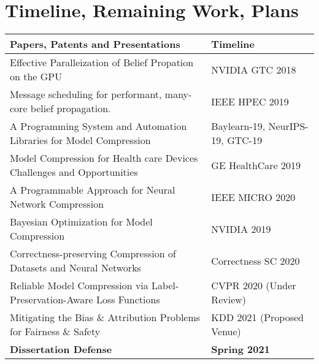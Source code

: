 \section{Timeline, Remaining Work, Plans}
\label{sec:timeline}

\begin{table*}[h]
\centering
\begin{center}
\begin{sc}
\begin{tabular}{ll}
\toprule
\textbf{Papers, Patents and Presentations}                                                  & \textbf{Timeline}        \\ \midrule
Effective Paralleization of Belief Propation on the GPU                  & NVIDIA GTC 2018          \\ 
Message scheduling for performant, many-core belief propagation.         & IEEE HPEC 2019           \\ \midrule
A Programming System and Automation Libraries for Model Compression                           & Baylearn-19, NeurIPS-19, GTC-19 \\
Model Compression for Health care Devices Challenges and Opportunities    & GE HealthCare 2019       \\
A Programmable Approach for Neural Network  Compression                  & IEEE MICRO 2020          \\
Bayesian Optimization for Model Compression                              & NVIDIA 2019              \\ \midrule
Correctness-preserving Compression of Datasets and Neural Networks & Correctness SC 2020      \\
Reliable Model Compression via Label-Preservation-Aware Loss Functions   & CVPR 2020 (Under Review) \\
Mitigating the Bias \& Attribution Problems for Fairness \& Safety & KDD 2021 (Proposed Venue)                             \\ \midrule
\textbf{Dissertation Defense}                                            & \textbf{Spring 2021} \\   
\bottomrule
\end{tabular}
\label{tab:results}
  \end{sc}
\end{center}
\end{table*}

